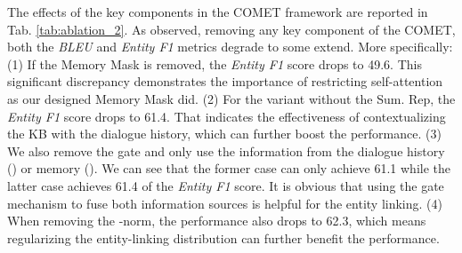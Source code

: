 \documentclass[11pt]{article}
\begin{document}
The effects of the key components in the COMET framework are reported in Tab. \ref{tab:ablation_2}. As observed, removing any key component of the COMET, both the \textit{BLEU} and \textit{Entity F1} metrics degrade to some extend. More specifically: 
(1) If the Memory Mask is removed, the \textit{Entity F1} score drops to 49.6. This significant discrepancy demonstrates the importance of restricting self-attention as our designed Memory Mask did.
(2) For the variant without the Sum. Rep, the \textit{Entity F1} score drops to 61.4. That indicates the effectiveness of contextualizing the KB with the dialogue history, which can further boost the performance.
(3) We also remove the gate and only use the information from the dialogue history () or memory (). We can see that the former case can only achieve 61.1 while the latter case achieves 61.4 of the \textit{Entity F1} score. It is obvious that using the gate mechanism to fuse both information sources is helpful for the entity linking.  
(4) When removing the -norm, the performance also drops to 62.3, which means regularizing the entity-linking distribution can further benefit the performance.


\begin{table}[htb]
\centering
{}
\caption{The performance of replacing the context-aware memory with Triplet, Row-Ent and Graph representations in COMET. Note that in the second row, we also report the result of a variant which only considers the KB context and ignores the dialogue context.}
\label{tab:transformer+x}
\end{table}
\end{document}
